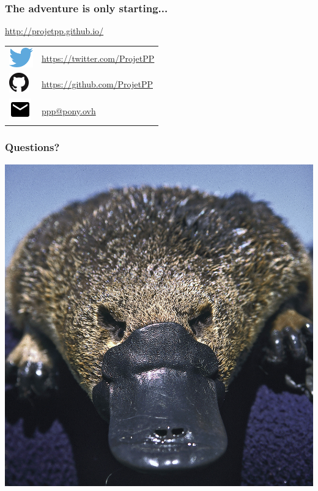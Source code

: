 \newlength{\logosize}
\setlength{\logosize}{12pt}
\begin{frame}
    \frametitle{The adventure is only starting...}
    \alert{\url{http://projetpp.github.io/}}

    \begin{tabular}{ll}
        \includegraphics[width=\logosize]{Twitter_logo_blue.png} & \href{https://twitter.com/ProjetPP}{https://twitter.com/ProjetPP}\\
        \includegraphics[width=\logosize]{GitHub-Mark-32px.png} &  \href{https://github.com/ProjetPP}{https://github.com/ProjetPP}\\
        \includegraphics[width=\logosize]{ic_email_black_18dp.png} & \href{mailto:ppp@pony.ovh}{ppp@pony.ovh}\\
    \end{tabular}
\end{frame}


\begin{frame}
    \frametitle{Questions?}
    \begin{center}
        \includegraphics[height=0.7\textheight]{figures/Ornithorhynchus.jpg}
    \end{center}
\end{frame}


